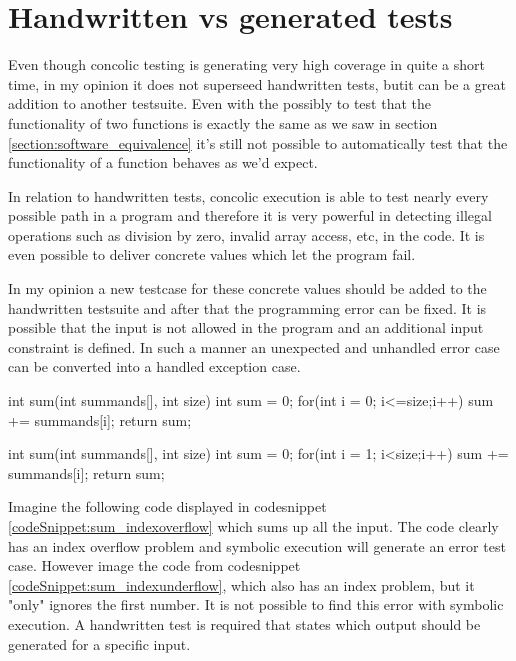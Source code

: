 \section{Handwritten vs generated tests}\label{section:handwritten_vs_generated_tests}
Even though concolic testing is generating very high coverage in quite a short time, in my opinion it does not superseed handwritten tests, butit can be a great addition to another testsuite. 
Even with the possibly to test that the functionality of two functions is exactly the same as we saw in section \ref{section:software_equivalence} it's still not possible to automatically test that the functionality of a function behaves as we'd expect.

In relation to handwritten tests, concolic execution is able to test nearly every possible path in a program and therefore it is very powerful in detecting illegal operations such as division by zero, invalid array access, etc, in the code. It is even possible to deliver concrete values which let the program fail. 

In my opinion a new testcase for these concrete values should be added to the handwritten testsuite and after that the programming error can be fixed. It is possible that the input is not allowed in the program and an additional input constraint is defined. In such a manner an unexpected and unhandled error case can be converted into a handled exception case.

\begin{codesnippet}[caption={Sum with index overflow}, label={codeSnippet:sum_indexoverflow}]
int sum(int summands[], int size){
   int sum = 0;
   for(int i = 0; i<=size;i++){
      sum += summands[i];
   }
   return sum;
}
\end{codesnippet}
\begin{codesnippet}[caption={Sum with index "underflow"}, label={codeSnippet:sum_indexunderflow}]
int sum(int summands[], int size){
   int sum = 0;
   for(int i = 1; i<size;i++){
      sum += summands[i];
   }
   return sum;
}
\end{codesnippet}
Imagine the following code displayed in codesnippet \ref{codeSnippet:sum_indexoverflow} which sums up all the input. The code clearly has an index overflow problem and symbolic execution will generate an error test case. However image the code from codesnippet \ref{codeSnippet:sum_indexunderflow}, which also has an index problem, but it "only" ignores the first number. It is not possible to find this error with symbolic execution. A handwritten test is required that states which output should be generated for a specific input.